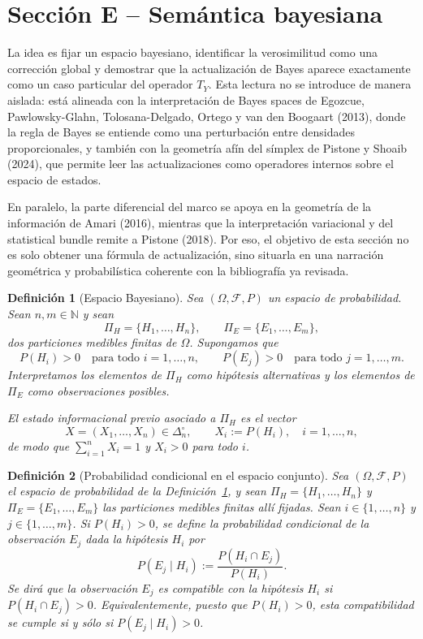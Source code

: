 ﻿\documentclass[12pt]{article}
\newtheorem{definicion}{Definición}[section]
\begin{document}
\section{Sección E -- Semántica bayesiana}

La idea es fijar un espacio bayesiano, identificar la verosimilitud como una corrección global y demostrar que la actualización de Bayes aparece exactamente como un caso particular del operador $T_Y$. Esta lectura no se introduce de manera aislada: está alineada con la interpretación de Bayes spaces de Egozcue, Pawlowsky-Glahn, Tolosana-Delgado, Ortego y van den Boogaart (2013), donde la regla de Bayes se entiende como una perturbación entre densidades proporcionales, y también con la geometría afín del símplex de Pistone y Shoaib (2024), que permite leer las actualizaciones como operadores internos sobre el espacio de estados.

En paralelo, la parte diferencial del marco se apoya en la geometría de la información de Amari (2016), mientras que la interpretación variacional y del statistical bundle remite a Pistone (2018). Por eso, el objetivo de esta sección no es solo obtener una fórmula de actualización, sino situarla en una narración geométrica y probabilística coherente con la bibliografía ya revisada.



\begin{definicion}[Espacio Bayesiano]\label{def:espacio_conjunto}
Sea $(\Omega,\mathcal F,P)$ un espacio de probabilidad. Sean $n,m\in\mathbb N$ y sean
\[
\Pi_H=\{H_1,\dots,H_n\},\qquad \Pi_E=\{E_1,\dots,E_m\},
\]
dos particiones medibles finitas de $\Omega$. Supongamos que
\[
P(H_i)>0\quad \text{para todo } i=1,\dots,n,
\qquad
P(E_j)>0\quad \text{para todo } j=1,\dots,m.
\]
Interpretamos los elementos de $\Pi_H$ como hipótesis alternativas y los elementos de $\Pi_E$ como observaciones posibles.

El estado informacional previo asociado a $\Pi_H$ es el vector
\[
X=(X_1,\dots,X_n)\in\Delta_n^\circ,
\qquad
X_i:=P(H_i),\quad i=1,\dots,n,
\]
de modo que $\sum_{i=1}^n X_i=1$ y $X_i>0$ para todo $i$.
\end{definicion}

\begin{definicion}[Probabilidad condicional en el espacio conjunto]\label{def:prob_condicional}
Sea $(\Omega,\mathcal F,P)$ el espacio de probabilidad de la Definición~\ref{def:espacio_conjunto}, y sean $\Pi_H=\{H_1,\dots,H_n\}$ y $\Pi_E=\{E_1,\dots,E_m\}$ las particiones medibles finitas allí fijadas. Sean $i\in\{1,\dots,n\}$ y $j\in\{1,\dots,m\}$. Si $P(H_i)>0$, se define la probabilidad condicional de la observación $E_j$ dada la hipótesis $H_i$ por
\[
P(E_j\mid H_i):=\frac{P(H_i\cap E_j)}{P(H_i)}.
\]
Se dirá que la observación $E_j$ es compatible con la hipótesis $H_i$ si $P(H_i\cap E_j)>0$. Equivalentemente, puesto que $P(H_i)>0$, esta compatibilidad se cumple si y sólo si $P(E_j\mid H_i)>0$.
\end{definicion}
\end{document}
